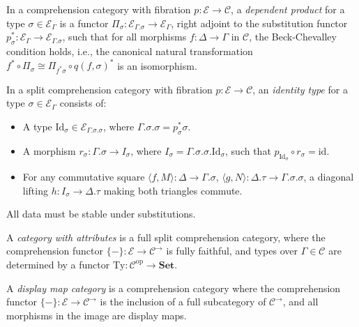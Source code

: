 \documentclass{article}
\begin{document}
\begin{definition}
In a comprehension category with fibration \(p : \mathcal{E} \to \mathcal{C}\), a \emph{dependent product} for a type \(\sigma \in \mathcal{E}_\Gamma\) is a functor \(\Pi_\sigma : \mathcal{E}_{\Gamma.\sigma} \to \mathcal{E}_\Gamma\), right adjoint to the substitution functor \(p_\sigma^* : \mathcal{E}_\Gamma \to \mathcal{E}_{\Gamma.\sigma}\), such that for all morphisms \(f : \Delta \to \Gamma\) in \(\mathcal{C}\), the Beck-Chevalley condition holds, i.e., the canonical natural transformation \(f^* \circ \Pi_\sigma \cong \Pi_{f^*\sigma} \circ q(f, \sigma)^*\) is an isomorphism.
\end{definition}

\begin{definition}
In a split comprehension category with fibration \(p : \mathcal{E} \to \mathcal{C}\), an \emph{identity type} for a type \(\sigma \in \mathcal{E}_\Gamma\) consists of:
\begin{itemize}
    \item A type \(\mathrm{Id}_\sigma \in \mathcal{E}_{\Gamma.\sigma.\sigma}\), where \(\Gamma.\sigma.\sigma = p_\sigma^* \sigma\).
    \item A morphism \(r_\sigma : \Gamma.\sigma \to I_\sigma\), where \(I_\sigma = \Gamma.\sigma.\sigma.\mathrm{Id}_\sigma\), such that \(p_{\mathrm{Id}_\sigma} \circ r_\sigma = \mathrm{id}\).
    \item For any commutative square \(\langle f, M \rangle : \Delta \to \Gamma.\sigma\), \(\langle g, N \rangle : \Delta.\tau \to \Gamma.\sigma.\sigma\), a diagonal lifting \(h : I_\sigma \to \Delta.\tau\) making both triangles commute.
\end{itemize}
All data must be stable under substitutions.
\end{definition}

\begin{definition}
A \emph{category with attributes} is a full split comprehension category, where the comprehension functor \(\{-\} : \mathcal{E} \to \mathcal{C}^\to\) is fully faithful, and types over \(\Gamma \in \mathcal{C}\) are determined by a functor \(\mathrm{Ty} : \mathcal{C}^{\mathrm{op}} \to \mathbf{Set}\).
\end{definition}

\begin{definition}
A \emph{display map category} is a comprehension category where the comprehension functor \(\{-\} : \mathcal{E} \to \mathcal{C}^\to\) is the inclusion of a full subcategory of \(\mathcal{C}^\to\), and all morphisms in the image are display maps.
\end{definition}
\end{document}
